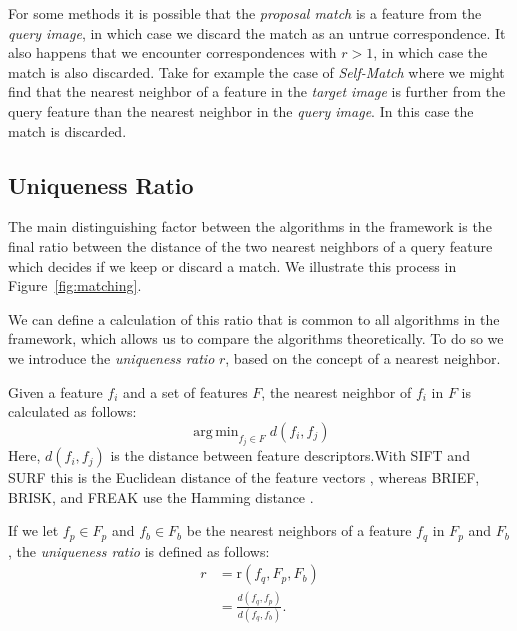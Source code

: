 \documentclass[review]{elsarticle}
\DeclareMathOperator*{\argmin}{arg\,min}
\begin{document}
For some methods it is possible that the \emph{proposal match} is a feature from the \emph{query image}, in which case we discard the match as an untrue correspondence.  It also happens that we encounter correspondences with $r>1$, in which case the match is also discarded.  Take for example the case of \emph{Self-Match} where we might find that the nearest neighbor of a feature in the \emph{target image} is further from the query feature than the nearest neighbor in the \emph{query image}. In this case the match is discarded. 

%
\subsection{Uniqueness Ratio}
%

The main distinguishing factor between the algorithms in the framework is the final ratio between the distance of the two nearest neighbors of a query feature which decides if we keep or discard a match. We illustrate this process in Figure~\ref{fig:matching}.

We can define a calculation of this ratio that is common to all algorithms in the framework, which allows us to compare the algorithms theoretically. To do so we we introduce the \emph{uniqueness ratio} $r$, based on the concept of a nearest neighbor.

Given a feature $f_i$ and a set of features $F$, the nearest neighbor of $f_i$ in $F$ is calculated as follows: 
\begin{equation*}
\argmin_{f_j \in F} d(f_i, f_j)
\end{equation*}
Here, $d(f_i, f_j)$ is the distance between feature descriptors.With SIFT and SURF this is the Euclidean distance of the feature vectors \cite{lowe2004sift,bay2006surf}, whereas BRIEF, BRISK, and FREAK use the Hamming distance \cite{leutenegger2011brisk,calonder2010brief,alahi2012freak}.  

If we let $f_p \in F_{p}$ and $f_b \in F_{b}$ be the nearest neighbors of a feature $f_q$ in $F_{p}$ and $F_{b}$, the \emph{uniqueness ratio} is defined as follows:
\begin{align*}
    r &= \text{r}(f_{q}, F_{p}, F_{b}) \\
        &= \frac{d(f_{q}, f_{p})}{d(f_{q}, f_{b})}.
\end{align*}
\end{document}
